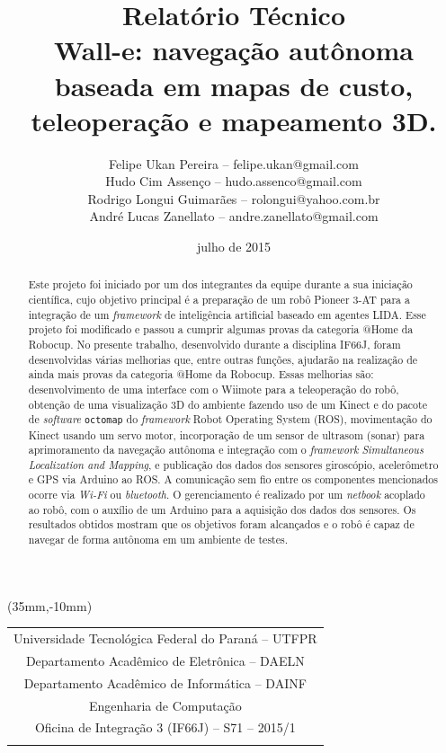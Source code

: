 \documentclass[a4paper,11pt]{article}
\title{
Relatório Técnico\\
\textbf{Wall-e: navegação autônoma baseada em mapas de custo, teleoperação e mapeamento 3D.}}
\author{
Felipe Ukan Pereira \footnotesize{-- felipe.ukan@gmail.com}\\
Hudo Cim Assenço \footnotesize{-- hudo.assenco@gmail.com}\\
Rodrigo Longui Guimarães \footnotesize{-- rolongui@yahoo.com.br}\\
André Lucas Zanellato \footnotesize{-- andre.zanellato@gmail.com}\\
}
\date{julho de 2015}
\begin{document}
\thisfancyput(35mm,-10mm){
\begin{tabular}{c}
Universidade Tecnológica Federal do Paraná -- \small{UTFPR}\\
Departamento Acadêmico de Eletrônica -- \small{DAELN}\\
Departamento Acadêmico de Informática -- \small{DAINF}\\
Engenharia de Computação\\
Oficina de Integração 3 (IF66J) -- S71 -- 2015/1 \\
\\
\hline
\end{tabular}}

\maketitle

\begin{abstract}
\noindent Este projeto foi iniciado por um dos integrantes da equipe durante a sua iniciação científica, cujo objetivo principal é a preparação de um robô Pioneer 3-AT para a integração de um \textit{framework} de inteligência artificial baseado em agentes LIDA. Esse projeto foi modificado e passou a cumprir algumas provas da categoria @Home da Robocup. No presente trabalho, desenvolvido durante a disciplina IF66J, foram desenvolvidas várias melhorias que, entre outras funções, ajudarão na realização de ainda mais provas da categoria @Home da Robocup. Essas melhorias são: desenvolvimento de uma interface com o Wiimote para a teleoperação do robô, obtenção de uma visualização 3D do ambiente fazendo uso de um Kinect e do pacote de \textit{software} \verb|octomap| do \textit{framework} Robot Operating System (ROS), movimentação do Kinect usando um servo motor, incorporação de um sensor de ultrasom (sonar) para aprimoramento da navegação autônoma e integração com o \textit{framework} \textit{Simultaneous Localization and Mapping}, e publicação dos dados dos sensores giroscópio, acelerômetro e GPS via Arduino ao ROS. A comunicação sem fio entre os componentes mencionados ocorre via \textit{Wi-Fi} ou \textit{bluetooth}. O gerenciamento é realizado por um \textit{netbook} acoplado ao robô, com o auxílio de um Arduino para a aquisição dos dados dos sensores. Os resultados obtidos mostram que os objetivos foram alcançados e o robô é capaz de navegar de forma autônoma em um ambiente de testes.
\end{abstract}
\end{document}
